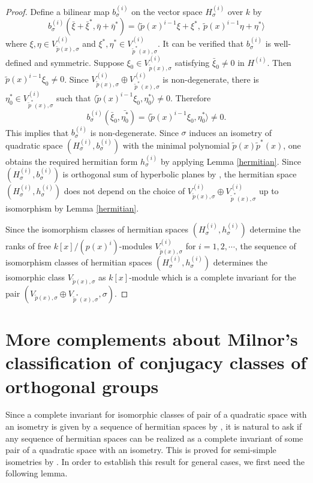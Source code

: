 \documentclass[12pt]{amsart}
\begin{document}
\begin{proof} Define a bilinear map $b_{\sigma}^{(i)}$ on the vector space $H_{\sigma}^{(i)}$ over $k$ by 
$$  b_{\sigma}^{(i)} (\bar \xi + \bar \xi^*,  \bar \eta + \bar \eta ^* ) = \langle \tilde{p} (x)^{i-1} \xi  + \xi ^* , \   \tilde{p} (x)^{i-1} \eta+  \eta^* \rangle $$
where $\xi, \eta \in V_{\tilde{p}(x), \sigma}^ {(i)}$ and $\xi^*, \eta^* \in V_{\tilde{p}^*(x), \sigma}^ {(i)}$.  It can be verified that $b_{\sigma}^{(i)}$ is well-defined and symmetric. Suppose $\xi_0 \in V_{\tilde{p}(x), \sigma}^ {(i)}$ satisfying $\bar \xi_0\neq 0$ in $H^{(i)}$.  Then $\tilde{p} (x)^{i-1} \xi_0 \neq 0$. Since $V_{\tilde{p}(x), \sigma}^ {(i)} \oplus V_{\tilde{p}^*(x), \sigma}^ {(i)}$ is non-degenerate, there is $\eta_0^*\in V_{\tilde{p}^*(x), \sigma}^ {(i)}$ such that $\langle \tilde{p} (x)^{i-1} \xi_0, \eta_0^* \rangle \neq 0$. Therefore 
$$ b_{\sigma}^{(i)} (\bar \xi_0,  \bar {\eta_0^*}) =\langle \tilde{p} (x)^{i-1} \xi_0, \eta_0^* \rangle \neq 0 . $$ This implies that $b_{\sigma}^{(i)}$ is non-degenerate.  Since $\sigma$ induces an isometry of quadratic space $(H_{\sigma}^{(i)}, b_{\sigma}^{(i)})$ with the minimal polynomial $\tilde{p}(x) \tilde{p}^*(x)$,  one obtains the required hermitian form $h_{\sigma}^{(i)}$ by applying Lemma \ref{hermitian}. 
Since $(H_{\sigma}^{(i)}, b_{\sigma}^{(i)})$ is orthogonal sum of hyperbolic planes by \cite[Lemma 3.1]{Mil}, the hermitian space $(H_{\sigma}^{(i)}, h_{\sigma}^{(i)})$ does not depend on the choice of $V_{\tilde{p}(x), \sigma}^ {(i)} \oplus V_{\tilde{p}^*(x), \sigma}^ {(i)}$ up to isomorphism by Lemma \ref{hermitian}. 

Since the isomorphism classes of hermitian spaces $(H_{\sigma}^{(i)}, h_{\sigma}^{(i)})$ determine the ranks of free $k[x]/(p(x)^i)$-modules $V_{\tilde{p}(x), \sigma}^ {(i)} $  for $i=1, 2, \cdots$, the  sequence of isomorphism classes of hermitian spaces $(H_{\sigma}^{(i)}, h_{\sigma}^{(i)})$ determines the isomorphic class $V_{\tilde{p}(x), \sigma} $ as $k[x]$-module which is a complete invariant for the pair $(V_{\tilde{p}(x), \sigma} \oplus V_{\tilde{p}^*(x), \sigma} , \sigma)$.  
\end{proof}



\section{More complements about Milnor's classification of conjugacy classes of orthogonal groups}

Since a complete invariant for isomorphic classes of pair of a quadratic space with an isometry is given by a sequence of hermitian spaces by \cite[Theorem 3.3]{Mil},  it is natural to ask if any sequence of hermitian spaces can be realized as a complete invariant of some pair of a quadratic space with an isometry.  This is proved for semi-simple isometries by \cite[Lemma 1.2]{Mil}. In order to establish this result for general cases, we first need the following lemma.
\end{document}
